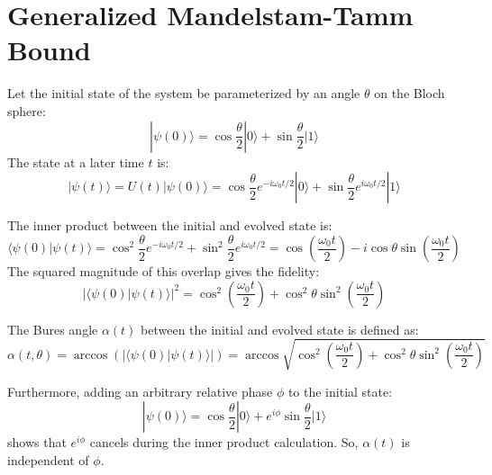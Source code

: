 \section{Generalized Mandelstam-Tamm Bound}
Let the initial state of the system be parameterized by an angle $\theta$ on the Bloch sphere:
\begin{equation}
    |\psi(0)\rangle = \cos\frac{\theta}{2} |0\rangle + \sin\frac{\theta}{2} |1\rangle
\end{equation}
The state at a later time $t$ is:
\begin{equation}
    |\psi(t)\rangle = U(t) |\psi(0)\rangle = \cos\frac{\theta}{2} e^{-i \omega_0 t / 2} |0\rangle + \sin\frac{\theta}{2} e^{i \omega_0 t / 2} |1\rangle
\end{equation}

The inner product between the initial and evolved state is:
\begin{equation}
    \langle \psi(0) | \psi(t) \rangle = \cos^2\frac{\theta}{2} e^{-i \omega_0 t / 2} + \sin^2\frac{\theta}{2} e^{i \omega_0 t / 2} = \cos\left(\frac{\omega_0 t}{2}\right) - i \cos\theta \sin\left(\frac{\omega_0 t}{2}\right)
\end{equation}
The squared magnitude of this overlap gives the fidelity:
\begin{equation}
    |\langle \psi(0) | \psi(t) \rangle|^2 = \cos^2\left(\frac{\omega_0 t}{2}\right) + \cos^2\theta \sin^2\left(\frac{\omega_0 t}{2}\right)
\end{equation}

The Bures angle $\alpha(t)$ between the initial and evolved state is defined as:
\begin{equation}
    \alpha(t, \theta) = \arccos\left(|\langle \psi(0) | \psi(t) \rangle|\right) = \arccos\sqrt{\cos^2\left(\frac{\omega_0 t}{2}\right) + \cos^2\theta \sin^2\left(\frac{\omega_0 t}{2}\right)}
\end{equation}

Furthermore, adding an arbitrary relative phase $\phi$ to the initial state:
\begin{equation}
    |\psi(0)\rangle = \cos\frac{\theta}{2} |0\rangle + e^{i\phi}\sin\frac{\theta}{2} |1\rangle
\end{equation}
shows that $e^{i\phi}$ cancels during the inner product calculation. So, $\alpha(t)$ is independent of $\phi$.

